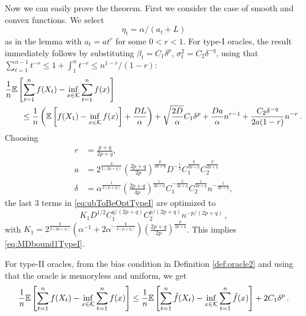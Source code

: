 Now we can easily prove the theorem.
First we consider the case of smooth and convex functions. We select $$\eta_t = \alpha/(a_t+L)$$ as in the lemma with 
$a_t=a t^r$ for some $0<r<1$. For type-I oracles, the result immediately follows by substituting $\beta_t = C_1\delta^p$, $\sigma^2_t = C_2 \delta^{-q}$, using that $\sum_{t=1}^{n-1} t^{-r} \le 1 +\int_1^n t^{-r} \le n^{1-r}/(1-r)$:
\begin{align}
\MoveEqLeft
\frac{1}{n} \EE{ \sum_{t=1}^n f( X_t) - \inf_{x \in \cK} \sum_{t=1}^n f(x)} \nonumber \\
&\le \frac{1}{n}\left(\EE{f(X_1)-\inf_{x \in \cK}f(x)}+\frac{DL}{\alpha}  \right) +\sqrt{\dfrac{2D}{\alpha}} C_1\delta^p
+\frac{Da}{\alpha} n^{r-1}+\dfrac{C_2 \delta^{-q}}{2a(1-r)}n^{-r} \,.
\label{eq:ubToBeOptTypeI}
 \end{align}
 Choosing 
 \begin{align*}
 r &= \tfrac{p+q}{2p+q},  \\
 a &= 2^{\frac{q}{2(2p+q)}}\left(\tfrac{2p+q}{2p}\right)^{\frac{p}{2p+q}} D^{-\frac{1}{2}} C_1^{\frac{q}{2p+q}} C_2^{\frac{p}{2p+q}} \\
 \delta &= \alpha^{\frac{1}{2(p+q)}}\left(\tfrac{2p+q}{4p}\right)^{\frac{1}{2p+q}} C_1^{-\frac{2}{2p+q}} C_2^{\frac{1}{2p+q}}n^{-\frac{1}{2p+q}},
 \end{align*}
the last $3$ terms in \eqref{eq:ubToBeOptTypeI} are optimized to
 \[
 K_1 D^{1/2} C_1^{q/(2p+q)} C_2^{p/(2p+q)} n ^{-p/(2p+q)} \,,
 \]
 with
 $K_1 = 2^{\frac{q}{2(2p+q)}} \left( \alpha^{-1}+2\alpha^{-\frac{q}{2(p+q)}} \right) \left( \frac{2p+q}{2p} \right)^{\frac{p}{2p+q}}$. This implies \eqref{eq:MDbound1TypeI}.

For type-II oracles, from the bias condition in Definition \ref{def:oracle2} and using that the oracle is memoryless and uniform, we get
\begin{align*}
 \frac{1}{n} \mathbb{E}\left[ \sum_{t=1}^n f(X_t) - \inf_{x \in \mathcal{K}}\sum_{t=1}^n f(x) \right]
 \le \frac{1}{n}\mathbb{E}\left[ \sum_{t=1}^n \tilde{f}(X_t) - \inf_{x \in \mathcal{K}}\sum_{t=1}^n \tilde{f}(x) \right] +2C_1 \delta^p
 \,.
\end{align*}

